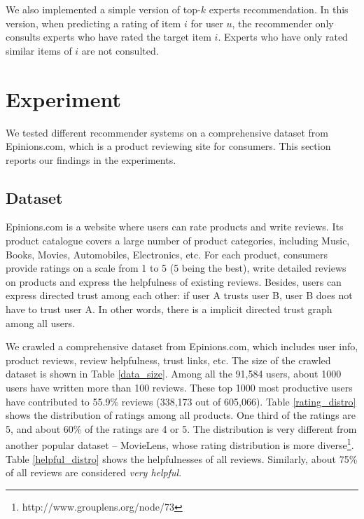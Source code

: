 \documentclass[12pt]{article}
\begin{document}
We also implemented a simple version of top-$k$ experts recommendation. In this version, when predicting a rating of item $i$ for user $u$, the recommender only consults experts who have rated the target item $i$. Experts who have only rated similar items of $i$ are not consulted.
 



\section{Experiment}
We tested different recommender systems on a comprehensive dataset from Epinions.com, which is a product reviewing site for consumers. This section reports our findings in the experiments.  
\subsection{Dataset}
Epinions.com is a website where users can rate products and write reviews. Its product catalogue covers a large number of product categories, including Music, Books, Movies, Automobiles, Electronics, etc. For each product, consumers provide ratings on a scale from 1 to 5 (5 being the best), write detailed reviews on products and express the helpfulness of existing reviews. Besides, users can express directed trust among each other: if user A trusts user B, user B does not have to trust user A. In other words, there is a implicit directed trust graph among all users. 

We crawled a comprehensive dataset from Epinions.com, which includes user info, product reviews, review helpfulness, trust links, etc. The size of the crawled dataset is shown in Table \ref{data_size}. Among all the 91,584 users, about 1000 users have written more than 100 reviews. These top 1000 most productive users have contributed to 55.9\% reviews (338,173 out of 605,066).  Table \ref{rating_distro} shows the distribution of ratings among all products. One third of the ratings are 5, and about 60\% of the ratings are 4 or 5. The distribution is very different from another popular dataset -- MovieLens, whose rating distribution is more diverse\footnote[1]{http://www.grouplens.org/node/73}. Table \ref{helpful_distro} shows the helpfulnesses of all reviews. Similarly, about 75\% of all reviews are considered \emph{very helpful}. 
\end{document}
